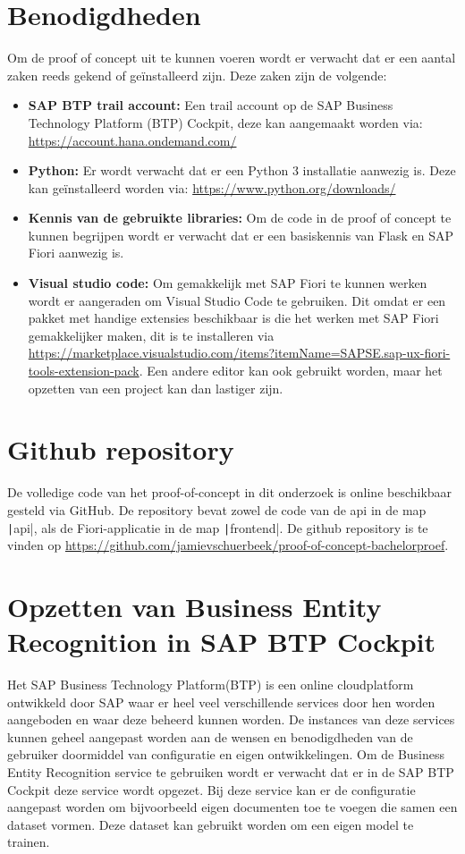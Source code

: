 \section{Benodigdheden}
Om de proof of concept uit te kunnen voeren wordt er verwacht dat er een aantal zaken reeds gekend of geïnstalleerd zijn. Deze zaken zijn de volgende:

\begin{itemize}
    \item \textbf{SAP BTP trail account:} Een trail account op de SAP Business Technology Platform (BTP) Cockpit, deze kan aangemaakt worden via: \url{https://account.hana.ondemand.com/}
    \item \textbf{Python:} Er wordt verwacht dat er een Python 3 installatie aanwezig is. Deze kan geïnstalleerd worden via: \url{https://www.python.org/downloads/}
    \item \textbf{Kennis van de gebruikte libraries:} Om de code in de proof of concept te kunnen begrijpen wordt er verwacht dat er een basiskennis van Flask en SAP Fiori aanwezig is.
    \item \textbf{Visual studio code: } Om gemakkelijk met SAP Fiori te kunnen werken wordt er aangeraden om Visual Studio Code te gebruiken. Dit omdat er een pakket met handige extensies beschikbaar is die het werken met SAP Fiori gemakkelijker maken, dit is te installeren via \url{https://marketplace.visualstudio.com/items?itemName=SAPSE.sap-ux-fiori-tools-extension-pack}. Een andere editor kan ook gebruikt worden, maar het opzetten van een project kan dan lastiger zijn.
\end{itemize}

\section{Github repository}
De volledige code van het proof-of-concept in dit onderzoek is online beschikbaar gesteld via GitHub. De repository bevat zowel de code van de api in de map \texttt|api|, als de Fiori-applicatie in de map \texttt|frontend|. De github repository is te vinden op \url{https://github.com/jamievschuerbeek/proof-of-concept-bachelorproef}.

\section{Opzetten van Business Entity Recognition in SAP BTP Cockpit}

Het SAP Business Technology Platform(BTP) is een online cloudplatform ontwikkeld door SAP waar er heel veel verschillende services door hen worden aangeboden en waar deze beheerd kunnen worden. De instances van deze services kunnen geheel aangepast worden aan de wensen en benodigdheden van de gebruiker doormiddel van configuratie en eigen ontwikkelingen.
Om de Business Entity Recognition service te gebruiken wordt er verwacht dat er in de SAP BTP Cockpit deze service wordt opgezet. Bij deze service kan er de configuratie aangepast worden om bijvoorbeeld eigen documenten toe te voegen die samen een dataset vormen. Deze dataset kan gebruikt worden om een eigen model te trainen.

